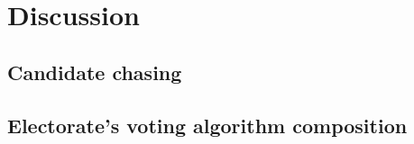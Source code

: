 \section{Discussion}
\label{sec:discussion}

\subsection{Candidate chasing}


\subsection{Electorate's voting algorithm composition}


